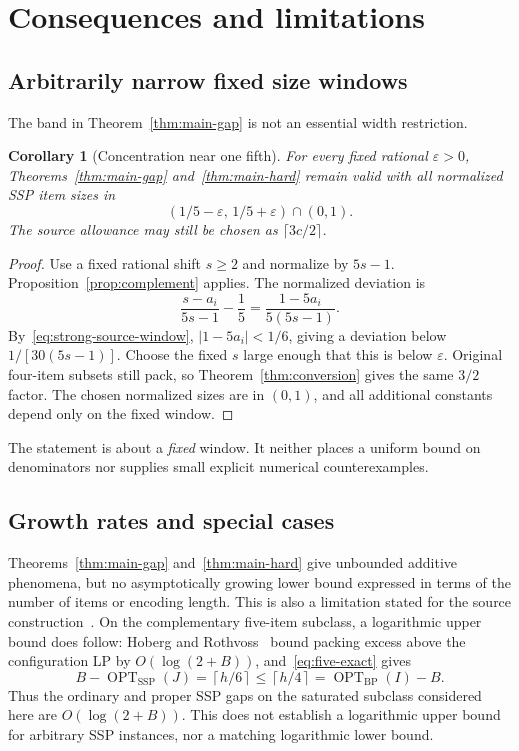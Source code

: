 \documentclass[11pt,a4paper]{article}
\newtheorem{corollary}[theorem]{Corollary}
\theoremstyle{definition}
\theoremstyle{remark}
\newcommand{\BP}{\mathrm{BP}}
\newcommand{\SSP}{\mathrm{SSP}}
\newcommand{\OPT}{\operatorname{OPT}}
\newcommand{\ceil}[1]{\left\lceil #1\right\rceil}
\begin{document}
\section{Consequences and limitations}\label{sec:discussion}
\subsection{Arbitrarily narrow fixed size windows}
The band in Theorem~\ref{thm:main-gap} is not an essential width restriction.
\begin{corollary}[Concentration near one fifth]\label{cor:narrow}
For every fixed rational $\varepsilon>0$, Theorems~\ref{thm:main-gap} and~\ref{thm:main-hard} remain valid with all normalized SSP item sizes in
\[
 (1/5-\varepsilon,\,1/5+\varepsilon)\cap(0,1).
\]
The source allowance may still be chosen as $\lceil3c/2\rceil$.
\end{corollary}
\begin{proof}
Use a fixed rational shift $s\ge2$ and normalize by $5s-1$. Proposition~\ref{prop:complement} applies. The normalized deviation is
\[
 \frac{s-a_i}{5s-1}-\frac15
 =\frac{1-5a_i}{5(5s-1)}.
\]
By~\eqref{eq:strong-source-window}, $|1-5a_i|<1/6$, giving a deviation below $1/[30(5s-1)]$. Choose the fixed $s$ large enough that this is below $\varepsilon$. Original four-item subsets still pack, so Theorem~\ref{thm:conversion} gives the same $3/2$ factor. The chosen normalized sizes are in $(0,1)$, and all additional constants depend only on the fixed window.
\end{proof}
The statement is about a \emph{fixed} window. It neither places a uniform bound on denominators nor supplies small explicit numerical counterexamples.

\subsection{Growth rates and special cases}
Theorems~\ref{thm:main-gap} and~\ref{thm:main-hard} give unbounded additive phenomena, but no asymptotically growing lower bound expressed in terms of the number of items or encoding length. This is also a limitation stated for the source construction~\cite{OAI26}. On the complementary five-item subclass, a logarithmic upper bound does follow: Hoberg and Rothvoss~\cite{HR17} bound packing excess above the configuration LP by $O(\log(2+B))$, and~\eqref{eq:five-exact} gives
\[
 B-\OPT_{\SSP}(J)=\ceil{h/6}\le\ceil{h/4}
 =\OPT_{\BP}(I)-B.
\]
Thus the ordinary and proper SSP gaps on the saturated subclass considered here are $O(\log(2+B))$. This does not establish a logarithmic upper bound for arbitrary SSP instances, nor a matching logarithmic lower bound.
\end{document}
